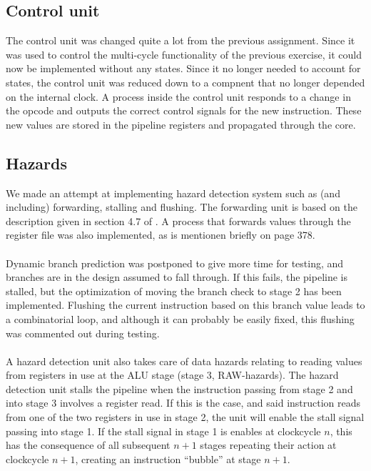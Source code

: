 \subsection{Control unit}
The control unit was changed quite a lot from the previous assignment. Since it was used to control the multi-cycle functionality of the previous exercise, it could now be implemented without any states. Since it no longer needed to account for states, the control unit was reduced down to a compnent that no longer depended on the internal clock. A process inside the control unit responds to a change in the opcode and outputs the correct control signals for the new instruction. These new values are stored in the pipeline registers and propagated through the core. 
\subsection{Hazards}
We made an attempt at implementing hazard detection system such as (and
including) forwarding, stalling and flushing. The forwarding unit is based on
the description given in section 4.7 of \cite{patterson12}. A process that
forwards values through the register file was also implemented, as is mentionen
briefly on page  378.
\paragraph*{}
Dynamic branch prediction was postponed to give more time for testing, and
branches are in the design assumed to fall through. If this fails, the pipeline
is stalled, but the optimization of moving the branch check to stage 2 has been
implemented. Flushing the current instruction based on this branch value leads
to a combinatorial loop, and although it can probably be easily fixed, this
flushing was commented out during testing.
\paragraph*{}
A hazard detection unit also takes care of data hazards relating to reading
values from registers in use at the ALU stage (stage 3, RAW-hazards). The
hazard detection unit stalls the pipeline when the instruction passing from
stage 2 and into stage 3 involves a register read. If this is the case, and said
instruction reads from one of the two registers in use in stage 2, the unit will
enable the stall signal passing into stage 1. If the stall signal in stage 1 is
enables at clockcycle $n$, this has the consequence of all subsequent $n+1$
stages repeating their action at clockcycle $n+1$, creating an instruction
``bubble'' at stage $n+1$.
